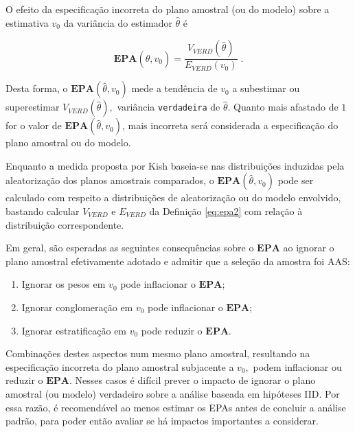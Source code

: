 \documentclass[]{book}
\theoremstyle{definition}
\theoremstyle{definition}
\theoremstyle{definition}
\theoremstyle{remark}
\let\BeginKnitrBlock\begin \let\EndKnitrBlock\end
\begin{document}
\BeginKnitrBlock{definition}
\protect\hypertarget{def:unnamed-chunk-2}{}{\label{def:unnamed-chunk-2} }O
efeito da especificação incorreta do plano amostral (ou do modelo) sobre
a estimativa \(v_{0}\) da variância do estimador \(\hat{\theta}\) é
\EndKnitrBlock{definition}

\begin{equation}
\mathbf{EPA}\left( \hat{\theta},v_{0}\right) =\frac{V_{VERD}\left(\hat{
\theta}\right) }{E_{VERD}\left( v_{0}\right) }\;.  \label{eq:epa2}
\end{equation}

Desta forma, o \(\mathbf{EPA}\left( \hat{\theta},v_{0}\right)\) mede a
tendência de \(v_{0}\) a subestimar ou superestimar
\(V_{VERD}\left( \hat{\theta}\right) ,\) variância \texttt{verdadeira}
de \(\hat{\theta}\). Quanto mais afastado de \(1\) for o valor de
\(\mathbf{EPA}\left( \hat{\theta},v_{0}\right)\), mais incorreta será
considerada a especificação do plano amostral ou do modelo.

Enquanto a medida proposta por Kish baseia-se nas distribuições
induzidas pela aleatorização dos planos amostrais comparados, o
\(\mathbf{EPA}\left( \hat{\theta},v_{0}\right)\) pode ser calculado com
respeito a distribuições de aleatorização ou do modelo envolvido,
bastando calcular \(V_{VERD}\) e \(E_{VERD}\) da Definição \eqref{eq:epa2}
com relação à distribuição correspondente.

Em geral, são esperadas as seguintes consequências sobre o
\(\mathbf{EPA}\) ao ignorar o plano amostral efetivamente adotado e
admitir que a seleção da amostra foi AAS:

\begin{enumerate}
\def\labelenumi{\arabic{enumi}.}
\item
  Ignorar os pesos em \(v_{0}\) pode inflacionar o \(\mathbf{EPA}\);
\item
  Ignorar conglomeração em \(v_{0}\) pode inflacionar o
  \(\mathbf{EPA}\);
\item
  Ignorar estratificação em \(v_{0}\) pode reduzir o \(\mathbf{EPA}\).
\end{enumerate}

Combinações destes aspectos num mesmo plano amostral, resultando na
especificação incorreta do plano amostral subjacente a \(v_{0},\) podem
inflacionar ou reduzir o \(\mathbf{EPA}\). Nesses casos é difícil prever
o impacto de ignorar o plano amostral (ou modelo) verdadeiro sobre a
análise baseada em hipóteses IID. Por essa razão, é recomendável ao
menos estimar os EPAs antes de concluir a análise padrão, para poder
então avaliar se há impactos importantes a considerar.
\end{document}
